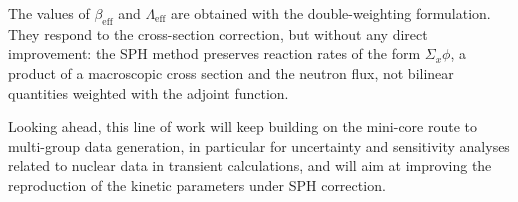 The values of $\beta_{\mathrm{eff}}$ and $\Lambda_{\mathrm{eff}}$ are obtained with the double-weighting formulation. They respond to the cross-section correction, but without any direct improvement: the SPH method preserves reaction rates of the form $\Sigma_x \phi$, a product of a macroscopic cross section and the neutron flux, not bilinear quantities weighted with the adjoint function.

Looking ahead, this line of work will keep building on the mini-core route to multi-group data generation, in particular for uncertainty and sensitivity analyses related to nuclear data in transient calculations, and will aim at improving the reproduction of the kinetic parameters under SPH correction.
